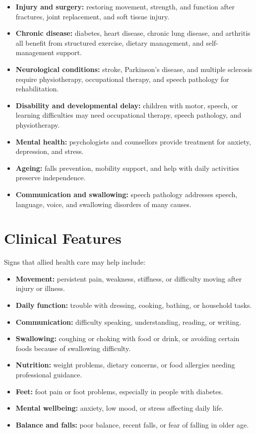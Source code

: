 \begin{itemize}
    \item \textbf{Injury and surgery:} restoring movement, strength, and function after fractures, joint replacement, and soft tissue injury.
    \item \textbf{Chronic disease:} diabetes, heart disease, chronic lung disease, and arthritis all benefit from structured exercise, dietary management, and self-management support.
    \item \textbf{Neurological conditions:} stroke, Parkinson's disease, and multiple sclerosis require physiotherapy, occupational therapy, and speech pathology for rehabilitation.
    \item \textbf{Disability and developmental delay:} children with motor, speech, or learning difficulties may need occupational therapy, speech pathology, and physiotherapy.
    \item \textbf{Mental health:} psychologists and counsellors provide treatment for anxiety, depression, and stress.
    \item \textbf{Ageing:} falls prevention, mobility support, and help with daily activities preserve independence.
    \item \textbf{Communication and swallowing:} speech pathology addresses speech, language, voice, and swallowing disorders of many causes.
\end{itemize}

\section*{Clinical Features}
Signs that allied health care may help include:

\begin{itemize}
    \item \textbf{Movement:} persistent pain, weakness, stiffness, or difficulty moving after injury or illness.
    \item \textbf{Daily function:} trouble with dressing, cooking, bathing, or household tasks.
    \item \textbf{Communication:} difficulty speaking, understanding, reading, or writing.
    \item \textbf{Swallowing:} coughing or choking with food or drink, or avoiding certain foods because of swallowing difficulty.
    \item \textbf{Nutrition:} weight problems, dietary concerns, or food allergies needing professional guidance.
    \item \textbf{Feet:} foot pain or foot problems, especially in people with diabetes.
    \item \textbf{Mental wellbeing:} anxiety, low mood, or stress affecting daily life.
    \item \textbf{Balance and falls:} poor balance, recent falls, or fear of falling in older age.
\end{itemize}

